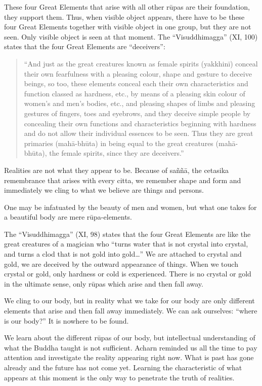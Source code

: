 These four Great Elements that arise with all other rūpas are their
foundation, they support them. Thus, when visible object appears, there
have to be these four Great Elements together with visible object in one
group, but they are not seen. Only visible object is seen at that
moment. The ``Visuddhimagga'' (XI, 100) states that the four Great
Elements are ``deceivers'':

\begin{quote}
``And just as the great creatures known as female spirits (yakkhinī)
conceal their own fearfulness with a pleasing colour, shape and gesture
to deceive beings, so too, these elements conceal each their own
characteristics and function classed as hardness, etc., by means of a
pleasing skin colour of women's and men's bodies, etc., and pleasing
shapes of limbs and pleasing gestures of fingers, toes and eyebrows, and
they deceive simple people by concealing their own functions and
characteristics beginning with hardness and do not allow their
individual essences to be seen. Thus they are great primaries
(mahā-bhūta) in being equal to the great creatures (mahā-bhūta), the
female spirits, since they are deceivers.''
\end{quote}

Realities are not what they appear to be. Because of saññā, the cetasika
remembrance that arises with every citta, we remember shape and form and
immediately we cling to what we believe are things and persons.

One may be infatuated by the beauty of men and women, but what one takes
for a beautiful body are mere rūpa-elements.

The ``Visuddhimagga'' (XI, 98) states that the four Great Elements are
like the great creatures of a magician who ``turns water that is not
crystal into crystal, and turns a clod that is not gold into
gold\ldots{}'' We are attached to crystal and gold, we are deceived by
the outward appearance of things. When we touch crystal or gold, only
hardness or cold is experienced. There is no crystal or gold in the
ultimate sense, only rūpas which arise and then fall away.

We cling to our body, but in reality what we take for our body are only
different elements that arise and then fall away immediately. We can ask
ourselves: ``where is our body?'' It is nowhere to be found.

We learn about the different rūpas of our body, but intellectual
understanding of what the Buddha taught is not sufficient. Acharn
reminded us all the time to pay attention and investigate the reality
appearing right now. What is past has gone already and the future has
not come yet. Learning the characteristic of what appears at this moment
is the only way to penetrate the truth of realities.

